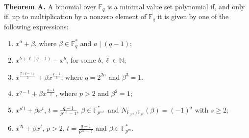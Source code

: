\documentclass[preprint,12pt]{elsarticle}
\begin{document}
\noindent \textbf{Theorem A.} 
A binomial over $\mathbb{F}_q$ is a minimal value set polynomial if, and only if, up to multiplication by a nonzero element of $\mathbb{F}_q$ it is given by one of the following expressions:
    \begin{enumerate}
        \item[$\mathrm{(i)}$] $x^a + \beta$, where $\beta \in \mathbb{F}_q^*$ and $a \mid (q - 1)$;
        \item[$\mathrm{(ii)}$] $x^{b + \ell(q - 1)} - x^b$, for some $b, \ell \in \mathbb{N}$;
        
        \item[$\mathrm{(iii)}$] $ x^{\frac{2(q-1)}{3}} + \beta x^{\frac{q-1}{3}}$, where $q = 2^{2n}$ and $\beta^3 = 1$.
        \item[$\mathrm{(iv)}$] $x^{q-1} + \beta x^{\frac{q-1}{2}}$, where $p> 2$ and $\beta^2=1$;
        \item[$\mathrm{(v)}$] $x^{p^{\ell}t} + \beta x^t$, $t = \frac{q - 1}{p^{s\ell} - 1}$, $\beta \in \mathbb{F}_{p^{s\ell}}^*$ and $N_{\mathbb{F}_{p^{s\ell}} / \mathbb{F}_{p^{\ell}}}(\beta) = (-1)^s$ with $s \geq 2$;
        \item[$\mathrm{(vi)}$] $x^{2t} + \beta x^t$, $p > 2$, $t = \frac{q - 1}{p^m - 1}$ and $\beta \in \mathbb{F}_{p^m}^*$. 
    \end{enumerate}
    
\end{document}

